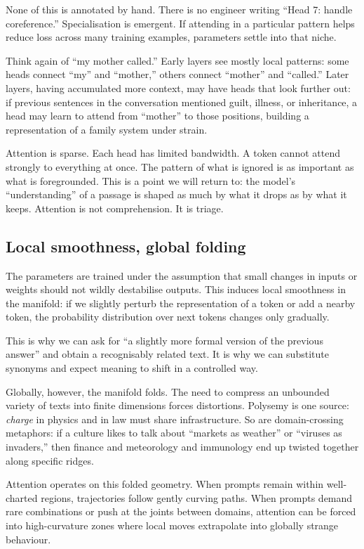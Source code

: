 None of this is annotated by hand. There is no engineer writing ``Head 7: handle coreference.'' Specialisation is emergent. If attending in a particular pattern helps reduce loss across many training examples, parameters settle into that niche.

Think again of ``my mother called.'' Early layers see mostly local patterns: some heads connect ``my'' and ``mother,'' others connect ``mother'' and ``called.'' Later layers, having accumulated more context, may have heads that look further out: if previous sentences in the conversation mentioned guilt, illness, or inheritance, a head may learn to attend from ``mother'' to those positions, building a representation of a family system under strain.

Attention is sparse. Each head has limited bandwidth. A token cannot attend strongly to everything at once. The pattern of what is ignored is as important as what is foregrounded. This is a point we will return to: the model's ``understanding'' of a passage is shaped as much by what it drops as by what it keeps. Attention is not comprehension. It is triage.

\subsection*{Local smoothness, global folding}

The parameters are trained under the assumption that small changes in inputs or weights should not wildly destabilise outputs. This induces local smoothness in the manifold: if we slightly perturb the representation of a token or add a nearby token, the probability distribution over next tokens changes only gradually.

This is why we can ask for ``a slightly more formal version of the previous answer'' and obtain a recognisably related text. It is why we can substitute synonyms and expect meaning to shift in a controlled way.

Globally, however, the manifold folds. The need to compress an unbounded variety of texts into finite dimensions forces distortions. Polysemy is one source: \emph{charge} in physics and in law must share infrastructure. So are domain-crossing metaphors: if a culture likes to talk about ``markets as weather'' or ``viruses as invaders,'' then finance and meteorology and immunology end up twisted together along specific ridges.

Attention operates on this folded geometry. When prompts remain within well-charted regions, trajectories follow gently curving paths. When prompts demand rare combinations or push at the joints between domains, attention can be forced into high-curvature zones where local moves extrapolate into globally strange behaviour.

